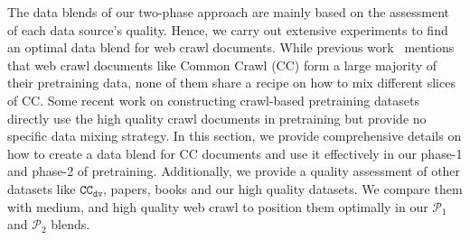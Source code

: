 \documentclass[11pt]{article}
\newcommand{\todo}[1]{{\color{red}\bf [TODO: #1]}\xspace}
\newcommand{\ccderiv}{$\mathtt{CC_{dv}}$\xspace}
\newcommand{\phaseone}{$\mathcal{P}_1$\xspace}
\newcommand{\phasetwo}{$\mathcal{P}_2$\xspace}
\begin{document}
The data blends of our two-phase approach are mainly based on the assessment of each data source's quality.
Hence, we carry out extensive experiments to find an optimal data blend for web crawl documents.
While previous work~\citep{dubey2024llama,yang2024qwen2,team2024gemma} mentions that web crawl documents like Common Crawl (CC) form a large majority of their pretraining data, none of them share a recipe on how to mix different slices of CC. 
Some recent work on constructing crawl-based pretraining datasets ~\citep{penedo2024fineweb,li2024datacomp} directly use the high quality crawl documents in pretraining but provide no specific data mixing strategy.
In this section, we provide comprehensive details on how to create a data blend for CC documents and use it effectively in our phase-1 and phase-2 of pretraining.
Additionally, we provide a quality assessment of other datasets like \ccderiv, papers, books and our high quality datasets. 
We compare them with medium, and high quality web crawl to position them optimally in our \phaseone and \phasetwo blends.

\begin{table}[t]
\centering
{}
\caption{CC blends (in \%) by quality. For $\mathtt{CC}$-$\mathtt{Blend3}$ and $\mathtt{CC}$-$\mathtt{Blend4}$, we merged the Medium and Medium-Low categories. \textit{Token} column refers to the the natural distribution of tokens, i.e. percentage of total CC data that belongs to each category.%
}
\label{table: crawl_data_mixing_phase1}

\end{table}
\end{document}
